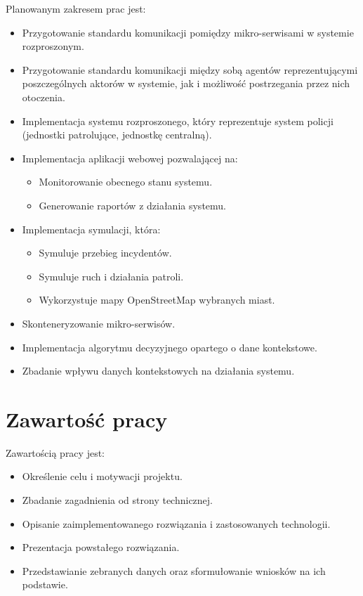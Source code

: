 Planowanym zakresem prac jest:
\begin{itemize}
    \item Przygotowanie standardu komunikacji pomiędzy mikro-serwisami w systemie rozproszonym.
    \item Przygotowanie standardu komunikacji między sobą agentów reprezentującymi poszczególnych aktorów w systemie, jak i możliwość postrzegania przez nich otoczenia.
    \item Implementacja systemu rozproszonego, który reprezentuje system policji (jednostki patrolujące, jednostkę centralną).
    \item Implementacja aplikacji webowej pozwalającej na:
    \begin{itemize}
        \item Monitorowanie obecnego stanu systemu.
        \item Generowanie raportów z działania systemu.
    \end{itemize}
    \item Implementacja symulacji, która:
    \begin{itemize}
        \item Symuluje przebieg incydentów.
        \item Symuluje ruch i działania patroli.
        \item Wykorzystuje mapy OpenStreetMap wybranych miast.
    \end{itemize}
    \item Skonteneryzowanie mikro-serwisów.
    \item Implementacja algorytmu decyzyjnego opartego o dane kontekstowe.
    \item Zbadanie wpływu danych kontekstowych na działania systemu.
\end{itemize}

\section{Zawartość pracy}
\label{sec:zawartoscPracy}

Zawartością pracy jest:
\begin{itemize}
    \item Określenie celu i motywacji projektu.
    \item Zbadanie zagadnienia od strony technicznej.
    \item Opisanie zaimplementowanego rozwiązania i zastosowanych technologii.
    \item Prezentacja powstałego rozwiązania.
    \item Przedstawianie zebranych danych oraz sformułowanie wniosków na ich podstawie.
\end{itemize}